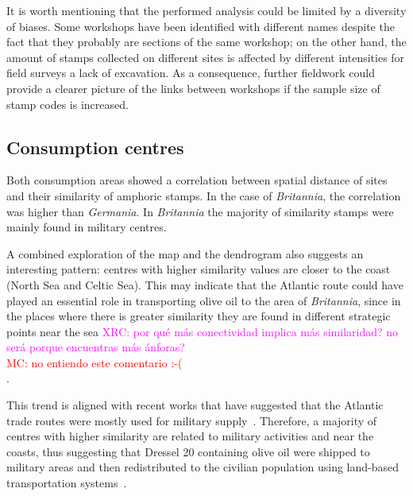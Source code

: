 \documentclass[review]{elsarticle}
\newcommand{\memo}[2]{\textcolor{#1}{#2}}
\newcommand{\maria}[1]{\memo{red}{MC: #1\\}}
\newcommand{\xavi}[1]{\memo{magenta}{XRC: #1\\}}
\begin{document}


It is worth mentioning that the performed analysis could be limited by a diversity of biases. Some workshops have been identified with different names despite the fact that they probably are sections of the same workshop; on the other hand, the amount of stamps collected on different sites is affected by different intensities for field surveys a lack of excavation. As a consequence, further fieldwork could provide a clearer picture of the links between workshops if the sample size of stamp codes is increased.

\subsection{Consumption centres}

Both consumption areas showed a correlation between spatial distance of sites and their similarity of amphoric stamps. In the case of  \textit{Britannia}, the correlation was higher than \textit{Germania}. In \textit{Britannia} the majority of similarity stamps were mainly found in military centres.  


A combined exploration of the map and the dendrogram also suggests an interesting pattern: centres with higher similarity values are closer to the coast (North Sea and Celtic Sea). This may indicate that the Atlantic route could have played an essential role in transporting olive oil to the area of \textit{Britannia}, since in the places where there is greater similarity they are found in different strategic points near the sea
\xavi{por qué más conectividad implica más similaridad? no será porque encuentras más ánforas?}
\maria{no entiendo este comentario :-(}.

This trend is aligned with recent works that have suggested that the Atlantic trade routes were mostly used for military supply~\citep{remesal_annona_1986,remesal_provincial_2008,carreras_atlantic_2012,morillo_hispania_2016,rubio-campillo_provincias_2018}. Therefore, a majority of centres with higher similarity are related to military activities and near the coasts, thus suggesting that Dressel 20 containing olive oil were shipped to military areas and then redistributed to the civilian population using land-based transportation systems~\citep{carreras_britannia_1998,ayllon_olive_2018}.
\end{document}
